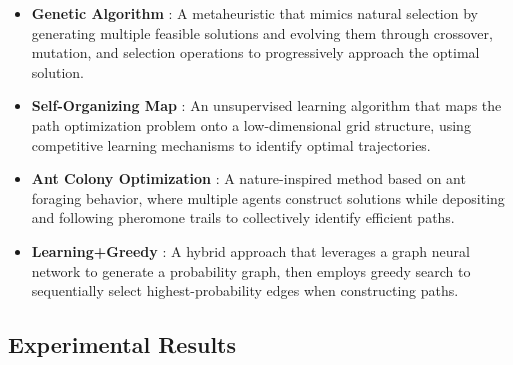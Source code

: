 \documentclass[sigconf]{acmart}
\begin{document}
\begin{itemize}
    \item \textbf{Genetic Algorithm} \cite{16-GA}: A metaheuristic that mimics natural selection by generating multiple feasible solutions and evolving them through crossover, mutation, and selection operations to progressively approach the optimal solution.

    \item \textbf{Self-Organizing Map} \cite{17-SOM}: An unsupervised learning algorithm that maps the path optimization problem onto a low-dimensional grid structure, using competitive learning mechanisms to identify optimal trajectories.

    \item \textbf{Ant Colony Optimization} \cite{18-ACO}: A nature-inspired method based on ant foraging behavior, where multiple agents construct solutions while depositing and following pheromone trails to collectively identify efficient paths.

    \item \textbf{Learning+Greedy} \cite{15-learning+greedy}: A hybrid approach that leverages a graph neural network to generate a probability graph, then employs greedy search to sequentially select highest-probability edges when constructing paths.

\end{itemize}


\subsection{Experimental Results}

\end{document}
